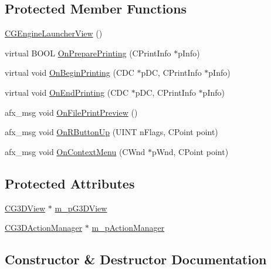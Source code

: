\subsection*{Protected Member Functions}
\begin{DoxyCompactItemize}
\item 
\hyperlink{class_c_g_engine_launcher_view_a659a04b0ab7fb5c734f93cef5bd1dcb3}{C\+G\+Engine\+Launcher\+View} ()
\item 
virtual B\+O\+O\+L \hyperlink{class_c_g_engine_launcher_view_ab4b5567ed9059e47939eb188a11b2c6d}{On\+Prepare\+Printing} (C\+Print\+Info $\ast$p\+Info)
\item 
virtual void \hyperlink{class_c_g_engine_launcher_view_afc073531bdaa190184f24213cac3e346}{On\+Begin\+Printing} (C\+D\+C $\ast$p\+D\+C, C\+Print\+Info $\ast$p\+Info)
\item 
virtual void \hyperlink{class_c_g_engine_launcher_view_aa348d27f7909819b2370eb8b7f30b37e}{On\+End\+Printing} (C\+D\+C $\ast$p\+D\+C, C\+Print\+Info $\ast$p\+Info)
\item 
afx\+\_\+msg void \hyperlink{class_c_g_engine_launcher_view_a10f3805c2dc231a6c0f8cef059b47ede}{On\+File\+Print\+Preview} ()
\item 
afx\+\_\+msg void \hyperlink{class_c_g_engine_launcher_view_afa4f29d135d68e9660e2548b65bfa2c0}{On\+R\+Button\+Up} (U\+I\+N\+T n\+Flags, C\+Point point)
\item 
afx\+\_\+msg void \hyperlink{class_c_g_engine_launcher_view_a65de0530c29caf775e5096a158055f53}{On\+Context\+Menu} (C\+Wnd $\ast$p\+Wnd, C\+Point point)
\end{DoxyCompactItemize}
\subsection*{Protected Attributes}
\begin{DoxyCompactItemize}
\item 
\hyperlink{class_c_g3_d_view}{C\+G3\+D\+View} $\ast$ \hyperlink{class_c_g_engine_launcher_view_a330085fb305e652da374d8696f065f1e}{m\+\_\+p\+G3\+D\+View}
\item 
\hyperlink{class_c_g3_d_action_manager}{C\+G3\+D\+Action\+Manager} $\ast$ \hyperlink{class_c_g_engine_launcher_view_ad40d3fedc9dc8972fca462ef5213c6f7}{m\+\_\+p\+Action\+Manager}
\end{DoxyCompactItemize}


\subsection{Constructor \& Destructor Documentation}
\hypertarget{class_c_g_engine_launcher_view_a659a04b0ab7fb5c734f93cef5bd1dcb3}{}
